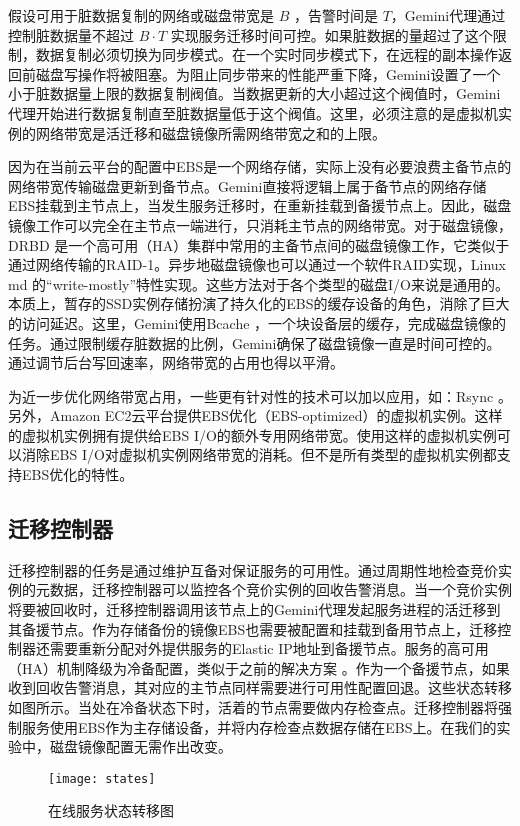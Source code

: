 假设可用于脏数据复制的网络或磁盘带宽是 $B$ ，告警时间是 $T$，Gemini代理通过控制脏数据量不超过 $B \cdot T$ 实现服务迁移时间可控。如果脏数据的量超过了这个限制，数据复制必须切换为同步模式。在一个实时同步模式下，在远程的副本操作返回前磁盘写操作将被阻塞。为阻止同步带来的性能严重下降，Gemini设置了一个小于脏数据量上限的数据复制阀值。当数据更新的大小超过这个阀值时，Gemini代理开始进行数据复制直至脏数据量低于这个阀值。这里，必须注意的是虚拟机实例的网络带宽是活迁移和磁盘镜像所需网络带宽之和的上限。

因为在当前云平台的配置中EBS是一个网络存储，实际上没有必要浪费主备节点的网络带宽传输磁盘更新到备节点。Gemini直接将逻辑上属于备节点的网络存储EBS挂载到主节点上，当发生服务迁移时，在重新挂载到备援节点上。因此，磁盘镜像工作可以完全在主节点一端进行，只消耗主节点的网络带宽。对于磁盘镜像，DRBD \cite{DRBD:2015} 是一个高可用（HA）集群中常用的主备节点间的磁盘镜像工作，它类似于通过网络传输的RAID-1。异步地磁盘镜像也可以通过一个软件RAID实现，Linux md \cite{Linux_md:2016} 的``write-mostly''特性实现。这些方法对于各个类型的磁盘I/O来说是通用的。本质上，暂存的SSD实例存储扮演了持久化的EBS的缓存设备的角色，消除了巨大的访问延迟。这里，Gemini使用Bcache \cite{Bcache:2016}，一个块设备层的缓存，完成磁盘镜像的任务。通过限制缓存脏数据的比例，Gemini确保了磁盘镜像一直是时间可控的。通过调节后台写回速率，网络带宽的占用也得以平滑。

为近一步优化网络带宽占用，一些更有针对性的技术可以加以应用，如：Rsync \cite{Rsync:2016}。另外，Amazon EC2云平台提供EBS优化（EBS-optimized）的虚拟机实例。这样的虚拟机实例拥有提供给EBS I/O的额外专用网络带宽。使用这样的虚拟机实例可以消除EBS I/O对虚拟机实例网络带宽的消耗。但不是所有类型的虚拟机实例都支持EBS优化的特性。

\subsection{迁移控制器}
迁移控制器的任务是通过维护互备对保证服务的可用性。通过周期性地检查竞价实例的元数据，迁移控制器可以监控各个竞价实例的回收告警消息。当一个竞价实例将要被回收时，迁移控制器调用该节点上的Gemini代理发起服务进程的活迁移到其备援节点。作为存储备份的镜像EBS也需要被配置和挂载到备用节点上，迁移控制器还需要重新分配对外提供服务的Elastic IP地址到备援节点。服务的高可用（HA）机制降级为冷备配置，类似于之前的解决方案 \cite{He:2015:CCH:2749246.2749275}。作为一个备援节点，如果收到回收告警消息，其对应的主节点同样需要进行可用性配置回退。这些状态转移如图所示。当处在冷备状态下时，活着的节点需要做内存检查点。迁移控制器将强制服务使用EBS作为主存储设备，并将内存检查点数据存储在EBS上。在我们的实验中，磁盘镜像配置无需作出改变。
\begin{figure}[]
  \centering
  \texttt{[image: states]}
  \caption{在线服务状态转移图}
  \label{figure:states}
\end{figure}

